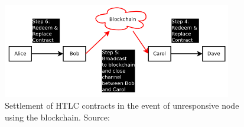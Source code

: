 \begin{figure}[h]
    \centering
    \includegraphics[width=10cm]{figures/htlc_bc.png}
    \caption{ Settlement of HTLC contracts in the event of unresponsive node using the blockchain. Source: \cite{poon2015bitcoin}}
    \label{fig:htlc_bc}
\end{figure}